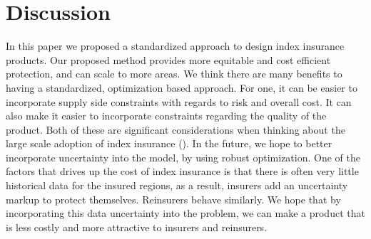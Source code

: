 \documentclass[11pt]{article}
\begin{document}
\section{Discussion}
  In this paper we proposed a standardized approach to design index insurance products. Our proposed method provides more equitable and cost efficient protection, and can scale to more areas. We think there are many benefits to having a standardized, optimization based approach. For one, it can be easier to incorporate supply side constraints with regards to risk and overall cost. It can also make it easier to incorporate constraints regarding the quality of the product. Both of these are significant considerations when thinking about the large scale adoption of index insurance (\cite{jensen2017agricultural}). In the future, we hope to better incorporate uncertainty into the model, by using robust optimization. One of the factors that drives up the cost of index insurance is that there is often very little historical data for the insured regions, as a result, insurers add an uncertainty markup to protect themselves. Reinsurers behave similarly. We hope that by incorporating this data uncertainty into the problem, we can make a product that is less costly and more attractive to insurers and reinsurers. 

\printbibliography
\end{document}
